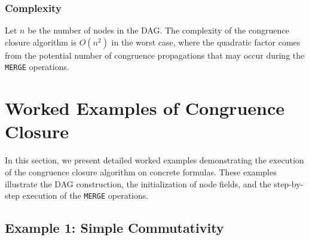 \documentclass[11pt,a4paper]{article}
\theoremstyle{definition}
\theoremstyle{plain}
\theoremstyle{remark}
\begin{document}
\subsubsection{Complexity}

\begin{tcolorbox}[colback=red!5!white,colframe=red!75!black,title=\textbf{Complexity Analysis}]
Let $n$ be the number of nodes in the DAG. The complexity of the congruence closure algorithm is $O(n^2)$ in the worst case, where the quadratic factor comes from the potential number of congruence propagations that may occur during the \texttt{MERGE} operations.
\end{tcolorbox}


\newpage

\section{Worked Examples of Congruence Closure}

In this section, we present detailed worked examples demonstrating the execution of the congruence closure algorithm on concrete formulas. These examples illustrate the DAG construction, the initialization of node fields, and the step-by-step execution of the \texttt{MERGE} operations.

\subsection{Example 1: Simple Commutativity}
\end{document}
